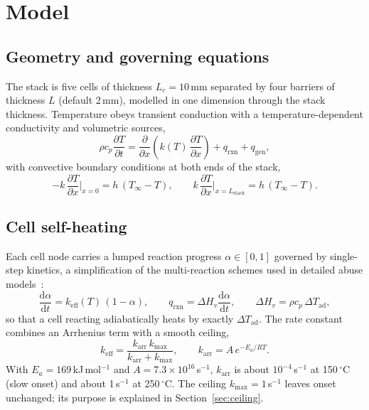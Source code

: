 \documentclass[11pt]{article}
\newcommand{\dd}{\mathrm{d}}
\newcommand{\kmax}{k_\mathrm{max}}
\begin{document}
\section{Model}

\subsection{Geometry and governing equations}

The stack is five cells of thickness $L_c = 10$\,mm separated by four barriers of
thickness $L$ (default 2\,mm), modelled in one dimension through the stack thickness.
Temperature obeys transient conduction with a temperature-dependent conductivity and
volumetric sources,
\begin{equation}
  \rho c_p \frac{\partial T}{\partial t}
  = \frac{\partial}{\partial x}\!\left(k(T)\,\frac{\partial T}{\partial x}\right)
  + q_\mathrm{rxn} + q_\mathrm{gen},
  \label{eq:heat}
\end{equation}
with convective boundary conditions at both ends of the stack,
\begin{equation}
  -k\,\frac{\partial T}{\partial x}\bigg|_{x=0} = h\,(T_\infty - T), \qquad
  k\,\frac{\partial T}{\partial x}\bigg|_{x=L_\mathrm{stack}} = h\,(T_\infty - T).
  \label{eq:bc}
\end{equation}

\subsection{Cell self-heating}

Each cell node carries a lumped reaction progress $\alpha \in [0,1]$ governed by
single-step kinetics, a simplification of the multi-reaction schemes used in detailed
abuse models~\cite{hatchard2001,spotnitz2003,kim2007abuse}:
\begin{equation}
  \frac{\dd\alpha}{\dd t} = k_\mathrm{eff}(T)\,(1-\alpha), \qquad
  q_\mathrm{rxn} = \Delta H_v \frac{\dd\alpha}{\dd t}, \qquad
  \Delta H_v = \rho c_p\,\Delta T_\mathrm{ad},
  \label{eq:kin}
\end{equation}
so that a cell reacting adiabatically heats by exactly $\Delta T_\mathrm{ad}$. The rate
constant combines an Arrhenius term with a smooth ceiling,
\begin{equation}
  k_\mathrm{eff} = \frac{k_\mathrm{arr}\,\kmax}{k_\mathrm{arr} + \kmax}, \qquad
  k_\mathrm{arr} = A\,e^{-E_a/RT}.
  \label{eq:keff}
\end{equation}
With $E_a = 169$\,kJ\,mol$^{-1}$ and $A = 7.3\times10^{16}$\,s$^{-1}$, $k_\mathrm{arr}$
is about $10^{-4}$\,s$^{-1}$ at 150\,$^\circ$C (slow onset) and about 1\,s$^{-1}$ at
250\,$^\circ$C. The ceiling $\kmax = 1$\,s$^{-1}$ leaves onset unchanged; its purpose is
explained in Section~\ref{sec:ceiling}.
\end{document}
